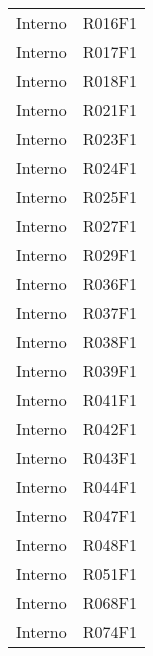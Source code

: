 \documentclass[../analisi-dei-requisiti.tex]{subfiles}
\begin{document}
\begin{longtable}[H]{c|c}
                                Interno & R016F1                               \\
                                Interno & R017F1                               \\
                                Interno & R018F1                               \\
                                Interno & R021F1                               \\
                                Interno & R023F1                               \\
                                Interno & R024F1                               \\
                                Interno & R025F1                               \\
                                Interno & R027F1                               \\
                                Interno & R029F1                               \\
                                Interno & R036F1                               \\
                                Interno & R037F1                               \\
                                Interno & R038F1                               \\
                                Interno & R039F1                               \\
                                Interno & R041F1                               \\
                                Interno & R042F1                               \\
                                Interno & R043F1                               \\
                                Interno & R044F1                               \\
                                Interno & R047F1                               \\
                                Interno & R048F1                               \\
                                Interno & R051F1                               \\
                                Interno & R068F1                               \\
                                Interno & R074F1                               \\

\end{longtable}
\end{document}
